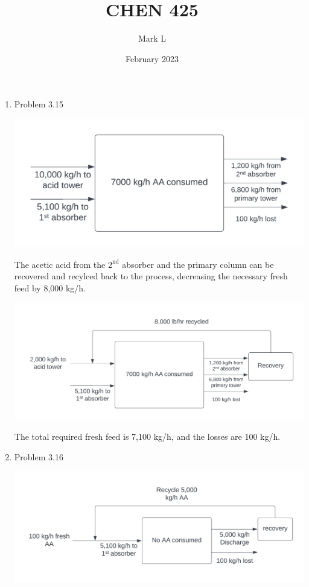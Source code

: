 \documentclass[12pt]{article}
\title{CHEN 425}
\author{Mark L}
\date{February 2023}
\begin{document}

\begin{enumerate}

\newpage
    \item Problem 3.15
    
    \includegraphics{assets/3.15-1.png}

    The acetic acid from the $2^{\mathrm{nd}}$ absorber and the primary column can be recovered and recylced back to the process, decreasing the necessary fresh feed by 8,000 kg/h.

    \includegraphics{assets/3.15-2.png}

    The total required fresh feed is 7,100 kg/h, and the losses are 100 kg/h.
    
\newpage
    \item Problem 3.16
    
    \includegraphics{assets/3.16.png}


\end{enumerate}
\end{document}
